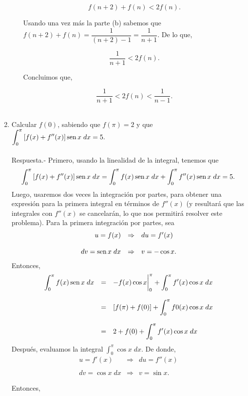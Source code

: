 \begin{enumerate}[\bfseries 1.]
\begin{enumerate}[(a)]
	    $$f(n+2)+f(n)<2f(n).$$

	    Usando una vez más la parte (b) sabemos que $f(n+2)+f(n)=\dfrac{1}{(n+2)-1}=\dfrac{1}{n+1}$. De lo que,

	    $$\dfrac{1}{n+1}<2f(n).$$

	    Concluimos que,

	    $$\dfrac{1}{n+1}<2f(n)<\dfrac{1}{n-1}.$$\\

    \end{enumerate}

    \item Calcular $f(0)$, sabiendo que $f(\pi)=2$ y que $\displaystyle\int_0^\pi \left[f(x)+f''(x)\right]\mathop{\mbox{\normalfont sen}}\nolimits x\; dx = 5.$\\\\
	Respuesta.-\; Primero, usando la linealidad de la integral, tenemos que
	$$\int_0^\pi\left[f(x)+f''(x)\right]\mathop{\mbox{\normalfont sen}}\nolimits x\; dx = \int_0^\pi f(x)\mathop{\mbox{\normalfont sen}}\nolimits x\; dx + \int_0^\pi f''(x)\mathop{\mbox{\normalfont sen}}\nolimits x\; dx=5.$$
	Luego, usaremos dos veces la integración por partes, para obtener una expresión para la primera integral en términos de $f''(x)$ (y resultará que las integrales con $f''(x)$ se cancelarán, lo que nos permitirá resolver este problema). Para la primera integración por partes, sea
	$$
	\begin{array}{rcl}
	    u = f(x) &\Rightarrow& du = f'(x)\\\\
	    dv=\mathop{\mbox{\normalfont sen}}\nolimits x\; dx &\Rightarrow& v = -\cos x.
	\end{array}
	$$
	Entonces,
	$$
	\begin{array}{rcl}
	    \displaystyle\int_0^\pi f(x)\mathop{\mbox{\normalfont sen}}\nolimits x\; dx &=& -f(x)\cos x \bigg|_0^\pi + \displaystyle\int_0^\pi f'(x)\cos x \; dx\\\\
						    &=& \left[f(\pi)+f(0)\right]+\displaystyle\int_0^\pi f0(x)\cos x\; dx\\\\
						    &=&2+f(0)+\displaystyle\int_0^\pi f'(x)\cos x\; dx
	\end{array}
	$$
	Después, evaluamos la integral $\int_0^\pi \cos x\; dx.$ De donde,
	$$
	\begin{array}{rcl}
	    u=f'(x) &\Rightarrow& du=f''(x)\\\\
	    dv=\cos x\; dx &\Rightarrow& v=\sin x.
	\end{array}
	$$

	Entonces,


\end{enumerate}
